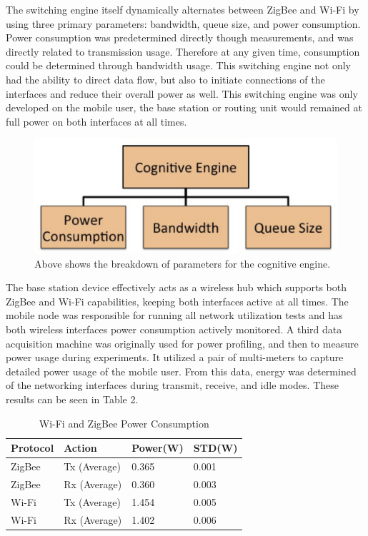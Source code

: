 \documentclass[conference]{IEEEtran}
\begin{document}
The switching engine itself dynamically alternates between ZigBee and Wi-Fi by using three primary parameters: bandwidth, queue size, and power consumption.  Power consumption was predetermined directly though measurements, and was directly related to transmission usage.  Therefore at any given time, consumption could be determined through bandwidth usage.  This switching engine not only had the ability to direct data flow, but also to initiate connections of the interfaces and reduce their overall power as well.  This switching engine was only developed on the mobile user, the base station or routing unit would remained at full power on both interfaces at all times.

\begin{figure}
\begin{center}
\includegraphics[scale=0.40]{cognitive_para.eps}
\caption{Above shows the breakdown of parameters for the cognitive engine.}
\end{center}
\end{figure}

The base station device effectively acts as a wireless hub which supports both ZigBee and Wi-Fi capabilities, keeping both interfaces active at all times.  The mobile node was responsible for running all network utilization tests and has both wireless interfaces power consumption actively monitored. A third data acquisition machine was originally used for power profiling, and then to measure power usage during experiments.  It utilized a pair of multi-meters to capture detailed power usage of the mobile user.  From this data, energy was determined of the networking interfaces during transmit, receive, and idle modes.  These results can be seen in Table 2.

\setcounter{table}{2}
\begin{table}[h!b!p!]
\caption{Wi-Fi and ZigBee Power Consumption}
\begin{center}
\begin{tabular}{llll}
\hline
Protocol & Action & Power(W) & STD(W)\\
\hline
ZigBee & Tx (Average) & 0.365 & 0.001\\
ZigBee & Rx (Average) & 0.360 & 0.003\\
Wi-Fi & Tx (Average) & 1.454 & 0.005\\
Wi-Fi & Rx (Average) & 1.402 & 0.006 \\
\hline
\end{tabular}
\end{center}
\label{table2}
\end{table}
\end{document}

